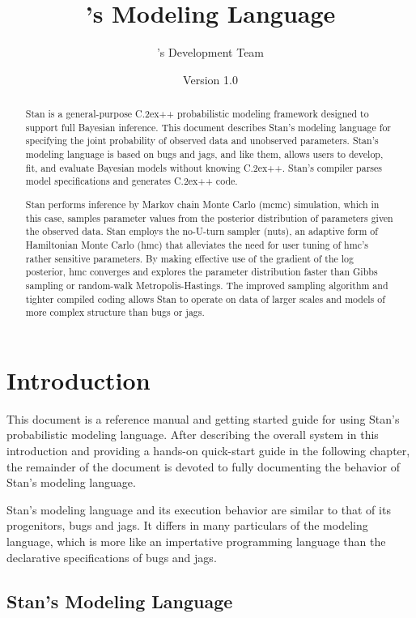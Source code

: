 \documentclass[10pt]{report}
\title{\Huge\bf \Stan's Modeling Language}
\author{\Stan's Development Team}
\date{Version 1.0} %
\newcommand{\Stan}{Stan\xspace}
\newcommand*{\Cpp}{C\raise.2ex\hbox{\footnotesize ++}\xspace} %
\newcommand{\acronym}[1]{{\sc #1}\xspace}
\newcommand{\BUGS}{\acronym{bugs}}
\newcommand{\JAGS}{\acronym{jags}}
\newcommand{\MCMC}{\acronym{mcmc}}
\newcommand{\HMC}{\acronym{hmc}}
\newcommand{\NUTS}{\acronym{nuts}}
\begin{document}
\maketitle

\begin{abstract}
  \Stan is a general-purpose \Cpp probabilistic modeling framework
  designed to support full Bayesian inference.  This document
  describes \Stan's modeling language for specifying the joint
  probability of observed data and unobserved parameters.  \Stan's
  modeling language is based on \BUGS and \JAGS, and like them, allows
  users to develop, fit, and evaluate Bayesian models without knowing
  \Cpp.  \Stan's compiler parses model specifications and generates
  \Cpp code.

  \Stan performs inference by Markov chain Monte Carlo (\MCMC)
  simulation, which in this case, samples parameter values from the
  posterior distribution of parameters given the observed data.  \Stan
  employs the no-U-turn sampler (\NUTS), an adaptive form of
  Hamiltonian Monte Carlo (\HMC) that alleviates the need for user
  tuning of \HMC's rather sensitive parameters.  By making effective
  use of the gradient of the log posterior, \HMC converges and
  explores the parameter distribution faster than Gibbs sampling or
  random-walk Metropolis-Hastings.  The improved sampling algorithm
  and tighter compiled coding allows \Stan to operate on data of
  larger scales and models of more complex structure than \BUGS or
  \JAGS.
\end{abstract}

\chapter{Introduction}

This document is a reference manual and getting started guide for
using \Stan's probabilistic modeling language.  After describing the
overall system in this introduction and providing a hands-on
quick-start guide in the following chapter, the remainder of the
document is devoted to fully documenting the behavior of
Stan's modeling language.

\Stan's modeling language and its execution behavior are similar to
that of its progenitors, \BUGS and \JAGS.  It differs in many
particulars of the modeling language, which is more like an
impertative programming language than the declarative specifications
of \BUGS and \JAGS.

\section{\Stan's Modeling Language}
\end{document}
